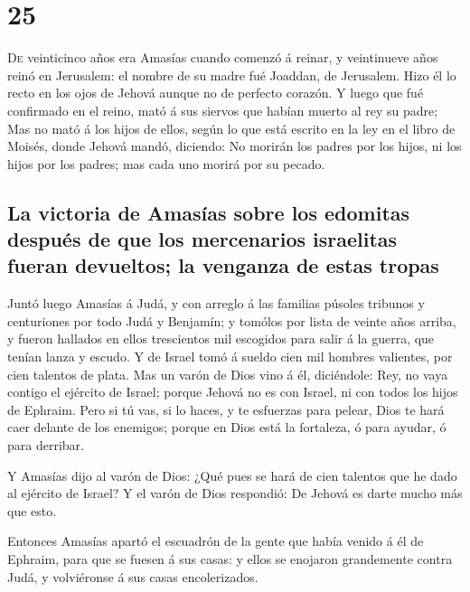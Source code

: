 \hypertarget{section-24}{%
\section{25}\label{section-24}}

 \textsc{De} veinticinco años era Amasías cuando comenzó á
reinar, y veintinueve años reinó en Jerusalem: el nombre de su madre fué
Joaddan, de Jerusalem.  Hizo él lo recto en los ojos de
Jehová aunque no de perfecto corazón.  Y luego que fué
confirmado en el reino, mató á sus siervos que habían muerto al rey su
padre;  Mas no mató á los hijos de ellos, según lo que
está escrito en la ley en el libro de Moisés, donde Jehová mandó,
diciendo: No morirán los padres por los hijos, ni los hijos por los
padres; mas cada uno morirá por su pecado.

\hypertarget{la-victoria-de-amasuxedas-sobre-los-edomitas-despuuxe9s-de-que-los-mercenarios-israelitas-fueran-devueltos-la-venganza-de-estas-tropas}{%
\subsection{La victoria de Amasías sobre los edomitas después de que los
mercenarios israelitas fueran devueltos; la venganza de estas
tropas}\label{la-victoria-de-amasuxedas-sobre-los-edomitas-despuuxe9s-de-que-los-mercenarios-israelitas-fueran-devueltos-la-venganza-de-estas-tropas}}

 Juntó luego Amasías á Judá, y con arreglo á las familias
púsoles tribunos y centuriones por todo Judá y Benjamín; y tomólos por
lista de veinte años arriba, y fueron hallados en ellos trescientos mil
escogidos para salir á la guerra, que tenían lanza y escudo.
 Y de Israel tomó á sueldo cien mil hombres valientes, por
cien talentos de plata.  Mas un varón de Dios vino á él,
diciéndole: Rey, no vaya contigo el ejército de Israel; porque Jehová no
es con Israel, ni con todos los hijos de Ephraim.  Pero si
tú vas, si lo haces, y te esfuerzas para pelear, Dios te hará caer
delante de los enemigos; porque en Dios está la fortaleza, ó para
ayudar, ó para derribar.

 Y Amasías dijo al varón de Dios: ¿Qué pues se hará de
cien talentos que he dado al ejército de Israel? Y el varón de Dios
respondió: De Jehová es darte mucho más que esto.

 Entonces Amasías apartó el escuadrón de la gente que
había venido á él de Ephraim, para que se fuesen á sus casas: y ellos se
enojaron grandemente contra Judá, y volviéronse á sus casas
encolerizados.

